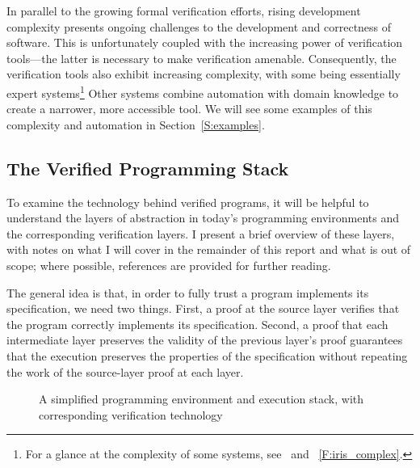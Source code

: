 In parallel to the growing formal verification efforts, rising development
complexity presents ongoing challenges to the development and correctness of
software. This is unfortunately coupled with the increasing power of
verification tools---the latter is necessary to make verification amenable.
Consequently, the verification tools also exhibit increasing complexity, with
some being essentially expert systems\footnote{For a glance at the complexity of
some systems, see~\cite{Jung_2015,Jung_2016,Krebbers_2017a,Jung_2018b} and
\figurename~\ref{F:iris_complex}.} Other systems combine automation with domain
knowledge to create a narrower, more accessible tool. We will see some examples
of this complexity and automation in Section~\ref{S:examples}.

\subsection{The Verified Programming Stack}\label{S:stack}

To examine the technology behind verified programs, it will be helpful to
understand the layers of abstraction in today's programming environments and the
corresponding verification layers. I present a brief overview of these layers,
with notes on what I will cover in the remainder of this report and what is out
of scope; where possible, references are provided for further reading.

The general idea is that, in order to fully trust a program implements its
specification, we need two things. First, a proof at the source layer verifies
that the program correctly implements its specification. Second, a proof that
each intermediate layer preserves the validity of the previous layer's proof
guarantees that the execution preserves the properties of the specification
without repeating the work of the source-layer proof at each layer.

\begin{figure}[ht]
    \centering
    \caption{A simplified programming environment and execution stack, with corresponding verification technology}\label{F:abstraction}
\end{figure}

